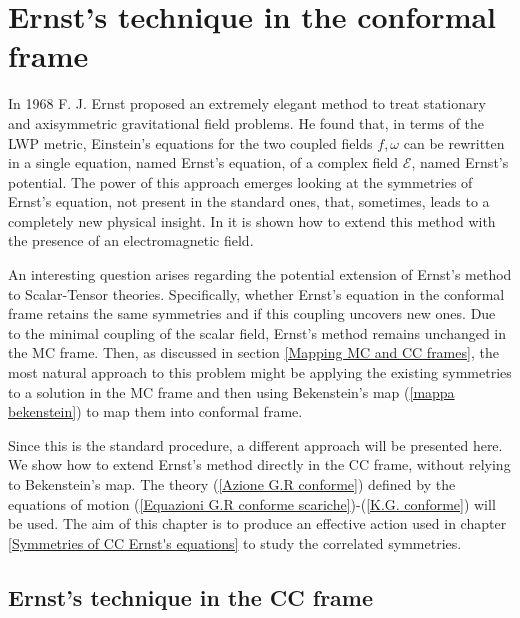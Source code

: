 


\chapter{Ernst's technique in the conformal frame} \label{solution generating technique}
\thispagestyle{empty}

In 1968 F. J. Ernst proposed \citep{ernst1} an extremely elegant method to treat stationary and axisymmetric gravitational field problems. He found that, in terms of the LWP metric, Einstein's equations for the two coupled fields $f,\omega$ can be rewritten in a single equation, named Ernst's equation, of a complex field $\mathcal{E}$, named Ernst's potential. The power of this approach emerges looking at the symmetries of Ernst's equation, not present in the standard ones, that, sometimes, leads to a completely new physical insight. In \citep{ernst2} it is shown how to extend this method with the presence of an electromagnetic field.   

An interesting question arises regarding the potential extension of Ernst's method to Scalar-Tensor theories. Specifically, whether Ernst's equation in the conformal frame retains the same symmetries and if this coupling uncovers new ones. Due to the minimal coupling of the scalar field, Ernst's method remains unchanged in the MC frame. Then, as discussed in section \ref{Mapping MC and CC frames}, the most natural approach to this problem might be applying the existing symmetries to a solution in the MC frame and then using Bekenstein's map (\ref{mappa bekenstein}) to map them into conformal frame.

Since this is the standard procedure, a different approach will be presented here. We show how to extend Ernst's method directly in the CC frame, without relying to Bekenstein's map. The theory (\ref{Azione G.R conforme}) defined by the equations of motion (\ref{Equazioni G.R conforme scariche})-(\ref{K.G. conforme}) will be used. The aim of this chapter is to produce an effective action used in chapter \ref{Symmetries of CC Ernst's equations} to study the correlated symmetries. 


\section{Ernst's technique in the CC frame}
